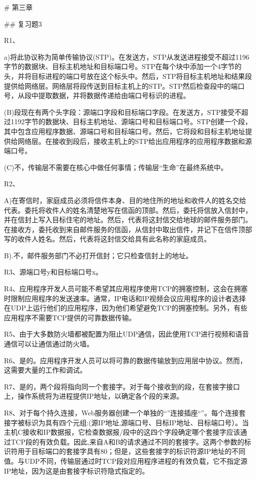 \documentclass[11pt,UTF8,twoside]{article}
\begin{document}
	# 第三章
	
	## 复习题3
	
	R1、
	
	a)将此协议称为简单传输协议(STP)。在发送方，STP从发送进程接受不超过1196字节的数据块、目标主机地址和目标端口号。STP在每个块中添加一个4字节的头，并将目标进程的端口号放在这个标头中。然后，STP将目标主机地址和结果段提供给网络层。网络层将段传送到目标主机上的STP。STP然后检查段中的端口号，从段中提取数据，并将数据传递给由端口号标识的进程。
	
	(B)段现在有两个头字段：源端口字段和目标端口字段。在发送方，STP接受不超过1192字节的数据块、目标主机地址、源端口号和目标端口号。STP创建一个段，其中包含应用程序数据、源端口号和目标端口号。然后，它将段和目标主机地址提供给网络层。在接收到段后，接收主机上的STP给出应用程序的应用程序数据和源端口号。
	
	(C)不，传输层不需要在核心中做任何事情；传输层“生命”在最终系统中。
	
	R2、
	
	A)在寄信时，家庭成员必须将信件本身、目的地住所的地址和收件人的姓名交给代表。委托将收件人的姓名清楚地写在信函的顶部。然后，委托将信放入信封中，并在信封上写入目标住宅的地址。然后，代表将这封信交给地球的邮件服务部门。在接收方，委托收到来自邮件服务的信函，从信封中取出信件，并记下在信件顶部写的收件人姓名。然后，代表将这封信交给具有此名称的家庭成员。
	
	B).不，邮件服务部门不必打开信封；它只检查信封上的地址。
	
	R3、源端口号y和目标端口号x。
	
	R4、应用程序开发人员可能不希望其应用程序使用TCP的拥塞控制，这会在拥塞时限制应用程序的发送速率。通常，IP电话和IP视频会议应用程序的设计者选择在UDP上运行他们的应用程序，因为他们希望避免TCP的拥塞控制。另外，有些应用程序不需要TCP提供的可靠数据传输。
	
	R5、由于大多数防火墙都被配置为阻止UDP通信，因此使用TCP进行视频和语音通信可以让通信通过防火墙。
	
	R6、是的。应用程序开发人员可以将可靠的数据传输放到应用层中协议。然而，这需要大量的工作和调试。
	
	R7、是的，两个段将指向同一个套接字。对于每个接收到的段，在套接字接口上，操作系统将为进程提供IP地址，以确定各个段的来源。
	
	R8、对于每个持久连接，Web服务器创建一个单独的“”连接插座“”。每个连接套接字被标识为具有四个元组:(源IP地址,源端口号、目标IP地址、目标端口号）。当主机C接收和IP数据报，它检查数据报/段中的这四个字段确定哪个套接字应该通过TCP段的有效负载。因此,来自A和B的请求通过不同的套接字。这两个参数的标识符用于目标端口的套接字具有80；但是，这些套接字的标识符源IP地址的不同值。与UDP不同，传输层通过时TCP段对应用程序进程的有效负载，它不指定源IP地址，因为这是由套接字标识符隐式指定的。
	
\end{document}

